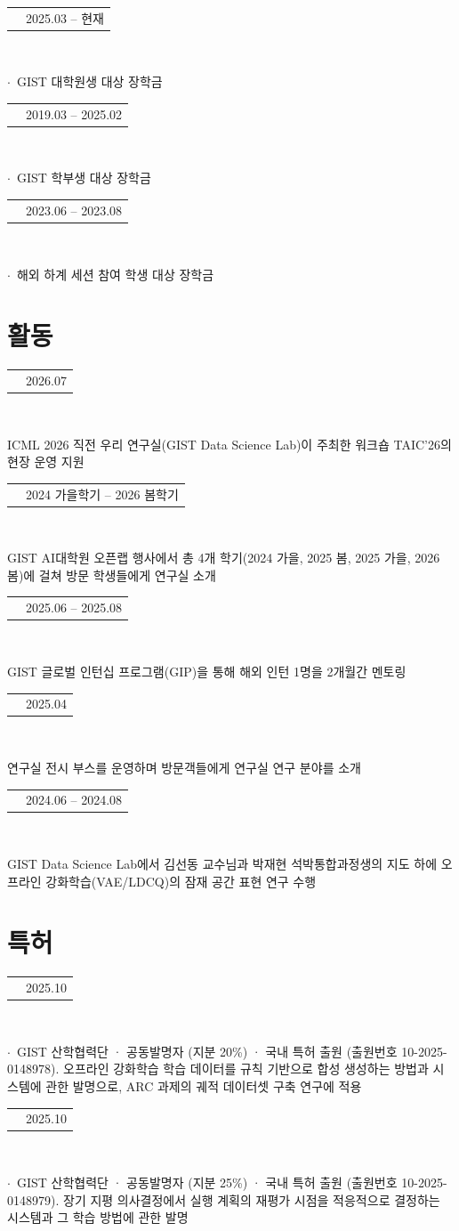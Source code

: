 \documentclass[10.5pt,a4paper]{article}
\makeatletter
\newcommand{\entry}[3]{%
  \noindent\begin{tabularx}{\linewidth}{@{}>{\raggedright\arraybackslash}X r@{}}
    {\hyphenpenalty=10000\exhyphenpenalty=10000\textbf{#1}} & \textcolor{textgray}{#2}
  \end{tabularx}\\
  {\raggedright\textcolor{textgray}{#3}\par}\vspace{0.5em}
}
\newcommand{\fund}[3]{%
  \noindent\begin{tabularx}{\linewidth}{@{}>{\raggedright\arraybackslash}X r@{}}
    {\hyphenpenalty=10000\exhyphenpenalty=10000\textbf{#1}} & \textcolor{textgray}{#2}
  \end{tabularx}\\
  {\raggedright\textcolor{textgray}{$\cdot$\ #3}\par}\vspace{0.5em}
}
\makeatother
\begin{document}
\fund{Korean Government Scholarships, GIST College}{2025.03 -- 현재}
{GIST 대학원생 대상 장학금}

\fund{Korean Government Scholarships, GIST College}{2019.03 -- 2025.02}
{GIST 학부생 대상 장학금}

\fund{Scholarship for Summer Session Abroad (UC Berkeley)}{2023.06 -- 2023.08}
{해외 하계 세션 참여 학생 대상 장학금}

\section{활동}

\entry{TAIC'26: Thinking about AI's Capability -- 운영 스태프}{2026.07}
{ICML 2026 직전 우리 연구실(GIST Data Science Lab)이 주최한 워크숍 TAIC'26의 현장 운영 지원}

\entry{GIST AI대학원 오픈랩 -- 연구실 소개}{2024 가을학기 -- 2026 봄학기}
{GIST AI대학원 오픈랩 행사에서 총 4개 학기(2024 가을, 2025 봄, 2025 가을, 2026 봄)에 걸쳐 방문 학생들에게 연구실 소개}

\entry{GIST Global Internship Program (GIP) -- 멘토}{2025.06 -- 2025.08}
{GIST 글로벌 인턴십 프로그램(GIP)을 통해 해외 인턴 1명을 2개월간 멘토링}

\entry{2025 대한민국과학기술대전 -- 부스 운영}{2025.04}
{연구실 전시 부스를 운영하며 방문객들에게 연구실 연구 분야를 소개}

\entry{GIST Summer Undergraduate Research Fellowship (G-SURF) -- 학부연구생}{2024.06 -- 2024.08}
{GIST Data Science Lab에서 김선동 교수님과 박재현 석박통합과정생의 지도 하에 오프라인 강화학습(VAE/LDCQ)의 잠재 공간 표현 연구 수행}

\newpage
\section{특허}

\fund{[특허출원] 오프라인 강화학습을 위한 규칙 기반 합성 데이터 생성 방법 및 시스템}{2025.10}
{GIST 산학협력단 · 공동발명자 (지분 20\%) · 국내 특허 출원 (출원번호 10-2025-0148978). 오프라인 강화학습 학습 데이터를 규칙 기반으로 합성 생성하는 방법과 시스템에 관한 발명으로, ARC 과제의 궤적 데이터셋 구축 연구에 적용}

\fund{[특허출원] 적응적 재평가 기반 실행 시스템 및 이의 제어 방법, 그리고 적응적 재평가 기반 실행 시스템의 학습 방법}{2025.10}
{GIST 산학협력단 · 공동발명자 (지분 25\%) · 국내 특허 출원 (출원번호 10-2025-0148979). 장기 지평 의사결정에서 실행 계획의 재평가 시점을 적응적으로 결정하는 시스템과 그 학습 방법에 관한 발명}
\end{document}
